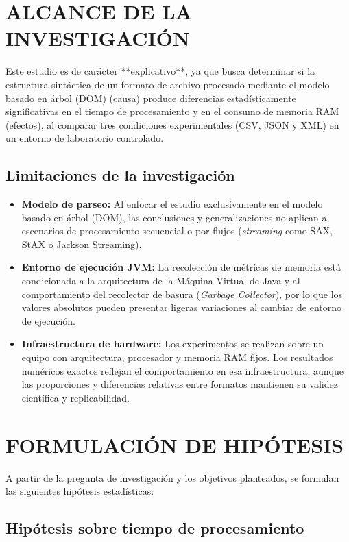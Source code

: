 
\section{ALCANCE DE LA INVESTIGACIÓN}

Este estudio es de carácter **explicativo**, ya que busca determinar si la estructura sintáctica de un formato de archivo procesado mediante el modelo basado en árbol (DOM) (causa) produce diferencias estadísticamente significativas en el tiempo de procesamiento y en el consumo de memoria RAM (efectos), al comparar tres condiciones experimentales (CSV, JSON y XML) en un entorno de laboratorio controlado.

\subsection{Limitaciones de la investigación}

\begin{itemize}
    \item \textbf{Modelo de parseo:} Al enfocar el estudio exclusivamente en el modelo basado en árbol (DOM), las conclusiones y generalizaciones no aplican a escenarios de procesamiento secuencial o por flujos (\textit{streaming} como SAX, StAX o Jackson Streaming).
    \item \textbf{Entorno de ejecución JVM:} La recolección de métricas de memoria está condicionada a la arquitectura de la Máquina Virtual de Java y al comportamiento del recolector de basura (\textit{Garbage Collector}), por lo que los valores absolutos pueden presentar ligeras variaciones al cambiar de entorno de ejecución.
    \item \textbf{Infraestructura de hardware:} Los experimentos se realizan sobre un equipo con arquitectura, procesador y memoria RAM fijos. Los resultados numéricos exactos reflejan el comportamiento en esa infraestructura, aunque las proporciones y diferencias relativas entre formatos mantienen su validez científica y replicabilidad.
\end{itemize}

\section{FORMULACIÓN DE HIPÓTESIS}

A partir de la pregunta de investigación y los objetivos planteados, se formulan las siguientes hipótesis estadísticas:

\subsection{Hipótesis sobre tiempo de procesamiento}

